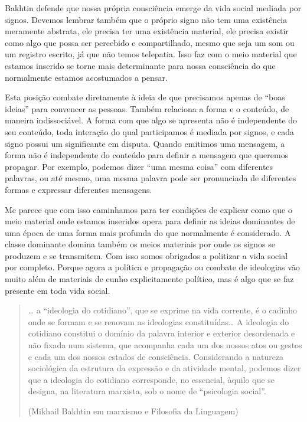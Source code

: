 Bakhtin defende que nossa própria consciência emerge da vida social mediada por signos. Devemos lembrar também que o próprio signo não tem uma existência meramente abstrata, ele precisa ter uma existência material, ele precisa existir como algo que possa ser percebido e compartilhado, mesmo que seja um som ou um registro escrito, já que não temos telepatia. Isso faz com o meio material que estamos inserido se torne mais determinante para nossa consciência do que normalmente estamos acostumados a  pensar.

Esta posição combate diretamente à ideia de que precisamos apenas de “boas ideias” para convencer as pessoas. Também relaciona a forma e o conteúdo, de maneira indissociável. A forma com que algo se apresenta não é independente do seu conteúdo, toda interação do qual participamos é mediada por signos, e cada signo possui um significante em disputa. Quando emitimos uma mensagem, a forma não é independente do conteúdo para definir a mensagem que queremos propagar. Por exemplo, podemos dizer “uma mesma coisa” com diferentes palavras, ou até mesmo, uma mesma palavra pode ser pronunciada de diferentes formas e expressar diferentes mensagens.

Me parece que com isso caminhamos para ter condições de explicar como que o meio material onde estamos inseridos opera para definir as ideias dominantes de uma época de uma forma mais profunda do que normalmente é considerado. A classe dominante domina também os meios materiais por onde os signos se produzem e se transmitem. Com isso somos obrigados a politizar a vida social por completo. Porque agora a política e propagação ou combate de ideologias vão muito além de materiais de cunho explicitamente político, mas é algo que se faz presente em toda vida social.

\begin{quote}
… a “ideologia do cotidiano”, que se exprime na vida corrente, é o cadinho onde se formam e se renovam as ideologias constituídas… A ideologia do cotidiano constitui o domínio da palavra interior e exterior desordenada e não fixada num sistema, que acompanha cada um dos nossos atos ou gestos e cada um dos nossos estados de consciência. Considerando a natureza sociológica da estrutura da expressão e da atividade mental, podemos dizer que a ideologia do cotidiano corresponde, no essencial, àquilo que se designa, na literatura marxista, sob o nome de “psicologia social”.

(Mikhail Bakhtin em marxismo e Filosofia da Linguagem)
\end{quote}

